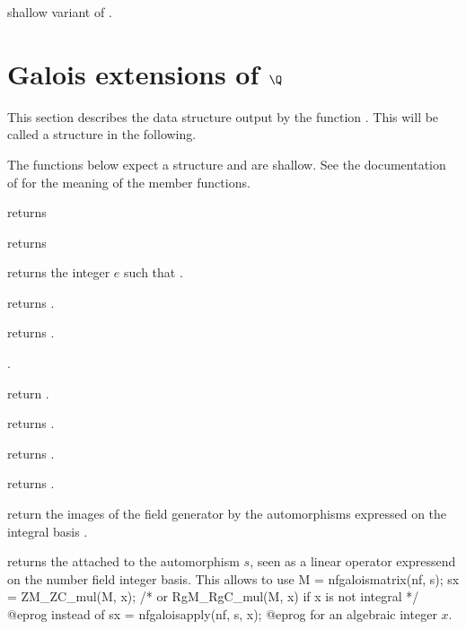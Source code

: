  shallow variant of
.


\section{Galois extensions of $\Q$}

This section describes the data structure output by the function
. This will be called a  structure in
the following.


The functions below expect a  structure and are shallow. See the
documentation of  for the meaning of the member functions.

 returns 

 returns 

 returns the integer $e$ such that
.

 returns .

 returns .

 .

 return .

 returns .

 returns .

 returns .


return the images of the field generator by the automorphisms
 expressed on the integral basis .

 returns the  attached to
the automorphism $s$, seen as a linear operator expressend on the number
field integer basis. This allows to use
\bprog
  M = nfgaloismatrix(nf, s);
  sx = ZM_ZC_mul(M, x);   /* or RgM_RgC_mul(M, x) if x is not integral */
@eprog\noindent
instead of
\bprog
  sx = nfgaloisapply(nf, s, x);
@eprog\noindent
for an algebraic integer $x$.

